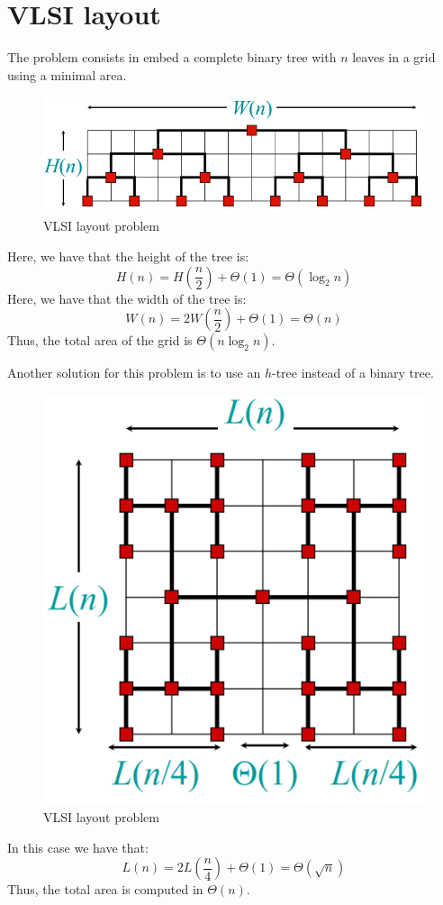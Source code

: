 \section{VLSI layout}

The problem consists in embed a complete binary tree with $n$ leaves in a grid using a minimal area. 
\begin{figure}[H]
    \centering
    \includegraphics[width=0.75\linewidth]{images/vlsi.png}
    \caption{VLSI layout problem}
\end{figure}
Here, we have that the height of the tree is: 
\[H(n)=H\left(\dfrac{n}{2}\right)+\Theta(1)=\Theta(\log_2n)\]
Here, we have that the width of the tree is: 
\[W(n)=2W\left(\dfrac{n}{2}\right)+\Theta(1)=\Theta(n)\]
Thus, the total area of the grid is $\Theta(n\log_2n)$.

Another solution for this problem is to use an $h$-tree instead of a binary tree. 
\begin{figure}[H]
    \centering
    \includegraphics[width=0.5\linewidth]{images/vlsi1.png}
    \caption{VLSI layout problem}
\end{figure}
In this case we have that: 
\[L(n)=2L\left(\dfrac{n}{4}\right)+\Theta(1)=\Theta(\sqrt{n})\]
Thus, the total area is computed in $\Theta(n)$. 